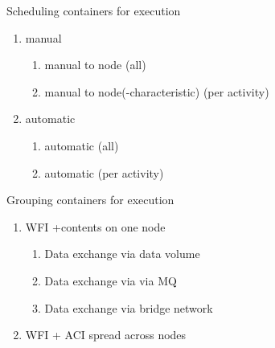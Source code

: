 Scheduling containers for execution
\begin{enumerate}[nosep]
  \item manual
    \begin{enumerate}[nosep]
      \item manual to node (all)
      \item manual to node(-characteristic) (per activity)
    \end{enumerate}
  \item automatic
    \begin{enumerate}[nosep]
      \item automatic (all)
      \item automatic (per activity)
    \end{enumerate}
\end{enumerate}

Grouping containers for execution
\begin{enumerate}[nosep]
  \item WFI +contents on one node
    \begin{enumerate}[nosep]
      \item Data exchange via data volume
      \item Data exchange via via MQ
      \item Data exchange via bridge network
    \end{enumerate}
  \item WFI + ACI spread across nodes
\end{enumerate}
